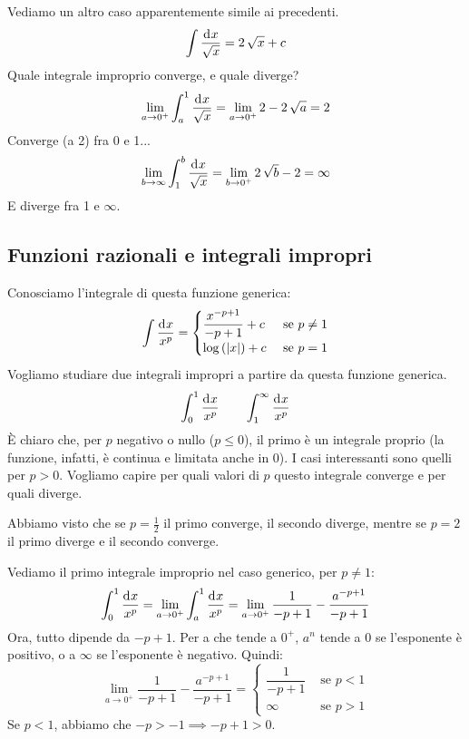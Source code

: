 \begin{exmp}
Vediamo un altro caso apparentemente simile ai precedenti. 
\[
\int \frac{\diff x}{\sqrt{x}} = 2 \, \sqrt{x} + c
\]
Quale integrale improprio converge, e quale diverge?
\[
\lim_{a \to 0^+} \int_{a}^{1} \frac{\diff x}{\sqrt{x}} =
\lim_{a \to 0^+} 2 - 2 \, \sqrt{a} = 2
\]
Converge (a 2) fra 0 e 1...
\[
\lim_{b \to \infty} \int_{1}^{b} \frac{\diff x}{\sqrt{x}} =
\lim_{b \to 0^+} 2 \, \sqrt{b} - 2 = \infty
\]
E diverge fra 1 e $\infty$.
\end{exmp}

\subsection{Funzioni razionali e integrali impropri}
\label{integrali_impropri_razionali}

Conosciamo l'integrale di questa funzione generica:
\[
\int \frac{\diff x}{x^p} = 
\begin{cases}
\dfrac{x^{-p + 1}}{- p + 1} + c & \text{ se } p \neq 1 \\
\abslog{x} + c & \text{ se } p = 1
\end{cases}
\]
Vogliamo studiare due integrali impropri a partire da questa funzione generica.
\begin{align*}
\int_{0}^{1} \frac{\diff x}{x^p} \qquad
\int_{1}^{\infty} \frac{\diff x}{x^p}
\end{align*}
\`E chiaro che, per $p$ negativo o nullo ($p \le 0$), il primo \`e un integrale proprio (la funzione, infatti, \`e continua e limitata anche in 0). I casi interessanti sono quelli per $p > 0$. Vogliamo capire per quali valori di $p$ questo integrale converge e per quali diverge.

Abbiamo visto che se $p = \frac{1}{2}$ il primo converge, il secondo diverge, mentre se $p = 2$ il primo diverge e il secondo converge.

Vediamo il primo integrale improprio nel caso generico, per $p \neq 1$:
\[
\int_{0}^{1} \frac{\diff x}{x^p} = 
\lim_{a \to 0^+} \int_{a}^{1} \frac{\diff x}{x^p} =
\lim_{a \to 0^+} \frac{1}{- p + 1} - \frac{a^{-p + 1}}{-p + 1}
\]
Ora, tutto dipende da $-p + 1$. Per a che tende a $0^+$, $a^n$ tende a $0$ se l'esponente \`e positivo, o a $\infty$ se l'esponente \`e negativo. Quindi:
\[
\lim_{a \to 0^+} \frac{1}{- p + 1} - \frac{a^{-p + 1}}{-p + 1} =
\begin{cases}
\dfrac{1}{- p + 1} & \text{ se } p < 1 \\
\infty & \text{ se } p > 1
\end{cases}
\]
Se $p < 1$, abbiamo che $-p > - 1 \implies - p + 1 > 0$.

